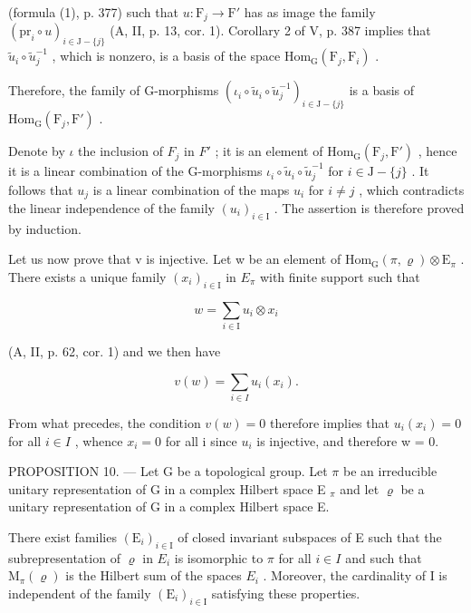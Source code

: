 (formula (1), p. 377) such that \(u \colon \mathrm{F}_j \to \mathrm{F}'\) has as image the family \((\mathrm{pr}_i \circ u)_{i \in \mathrm{J} - \{j\}}\) (A, II, p. 13, cor. 1). Corollary 2 of V, p. 387 implies that \(\widetilde{u}_i \circ \widetilde{u}_j^{-1}\) , which is nonzero, is a basis of the space \(\mathrm{Hom}_{\mathrm{G}}(\mathrm{F}_j, \mathrm{F}_i)\) .

Therefore, the family of G-morphisms \((\iota_{i} \circ \widetilde{u}_{i} \circ \widetilde{u}_{j}^{-1})_{i \in \mathrm{J} - \{j\}}\) is a basis of \(\mathrm{Hom}_{\mathrm{G}}(\mathrm{F}_{j}, \mathrm{F}')\) .

Denote by \(\iota\) the inclusion of \(F_{j}\) in \(F'\) ; it is an element of \(\mathrm{Hom}_{\mathrm{G}}(\mathrm{F}_{j}, \mathrm{F}')\) , hence it is a linear combination of the G-morphisms \(\iota_{i} \circ \widetilde{u}_{i} \circ \widetilde{u}_{j}^{-1}\) for \(i \in \mathrm{J} - \{j\}\) . It follows that \(u_{j}\) is a linear combination of the maps \(u_{i}\) for \(i \neq j\) , which contradicts the linear independence of the family \((u_{i})_{i \in \mathrm{I}}\) . The assertion is therefore proved by induction.

Let us now prove that v is injective. Let w be an element of \(\mathrm{Hom}_{\mathrm{G}}(\pi,\varrho)\otimes\mathrm{E}_{\pi}\) . There exists a unique family \((x_{i})_{i\in\mathrm{I}}\) in \(E_{\pi}\) with finite support such that

\[
w = \sum_ {i \in \mathrm{I}} u _ {i} \otimes x _ {i}
\]

(A, II, p. 62, cor. 1) and we then have

\[
v (w) = \sum_ {i \in I} u _ {i} (x _ {i}).
\]

From what precedes, the condition \(v(w) = 0\) therefore implies that \(u_{i}(x_{i}) = 0\) for all \(i \in I\) , whence \(x_{i} = 0\) for all i since \(u_{i}\) is injective, and therefore w = 0.

PROPOSITION 10. --- Let G be a topological group. Let \(\pi\) be an irreducible unitary representation of G in a complex Hilbert space E \(_{\pi}\) and let \(\varrho\) be a unitary representation of G in a complex Hilbert space E.

There exist families \((\mathrm{E}_{i})_{i\in\mathrm{I}}\) of closed invariant subspaces of E such that the subrepresentation of \(\varrho\) in \(E_{i}\) is isomorphic to \(\pi\) for all \(i\in I\) and such that \(\mathrm{M}_{\pi}(\varrho)\) is the Hilbert sum of the spaces \(E_{i}\) . Moreover, the cardinality of I is independent of the family \((\mathrm{E}_{i})_{i\in\mathrm{I}}\) satisfying these properties.

